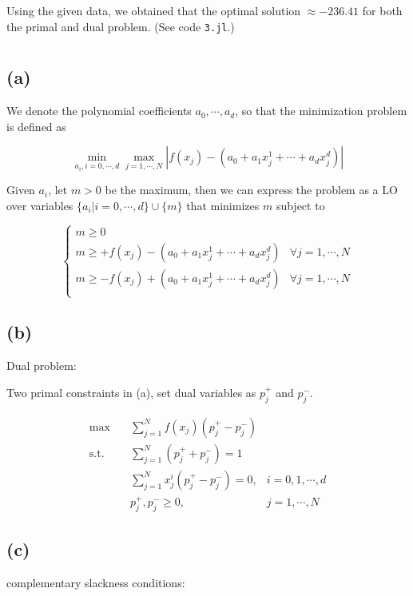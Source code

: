 \documentclass{article}
\newcommand{\1}{\bm 1}
\begin{document}
Using the given data, we obtained that the optimal solution $\approx -236.41$ for both the primal and dual problem. (See code \verb|3.jl|.)

\section{}
\subsection*{(a)}

We denote the polynomial coefficients $a_0, \cdots, a_d$, so that the minimization problem is defined as

$$
\min_{a_i, i = 0,\cdots, d}\max_{j=1,\cdots,N}|f(x_j) - (a_0+a_1x_j^1+\cdots+a_dx_j^d)|
$$

Given $a_i$, let $m>0$ be the maximum, then we can express the problem as a LO over variables $\{a_i|i=0,\cdots,d\} \cup \{m\}$ that minimizes $m$ subject to

$$
\begin{cases}
    m \ge 0\\
    m \ge + f(x_j) - (a_0 + a_1x_j^1+\cdots+a_dx_j^d) & \forall j=1, \cdots, N\\
    m \ge - f(x_j) + (a_0 + a_1x_j^1+\cdots+a_dx_j^d) & \forall j=1, \cdots, N\\
\end{cases}
$$

\subsection*{(b)}
Dual problem:

Two primal constraints in (a), set dual variables as $p^{+}_j$ and $p^{-}_j$.

\begin{align*}
    \max \quad & \sum^{N}_{j=1} f(x_j)(p^{+}_j - p^{-}_j) & \\
    \text{s.t.} \quad & \sum^{N}_{j=1}(p^{+}_j + p^{-}_j) = 1 \\
    & \sum^{N}_{j=1}x^{i}_j (p^{+}_j - p^{-}_j) = 0, & i = 0, 1, \cdots, d \\
    & p^{+}_j, p^{-}_j \geq 0, & j = 1, \cdots, N
\end{align*}

\subsection*{(c)}
complementary slackness conditions:
\end{document}
